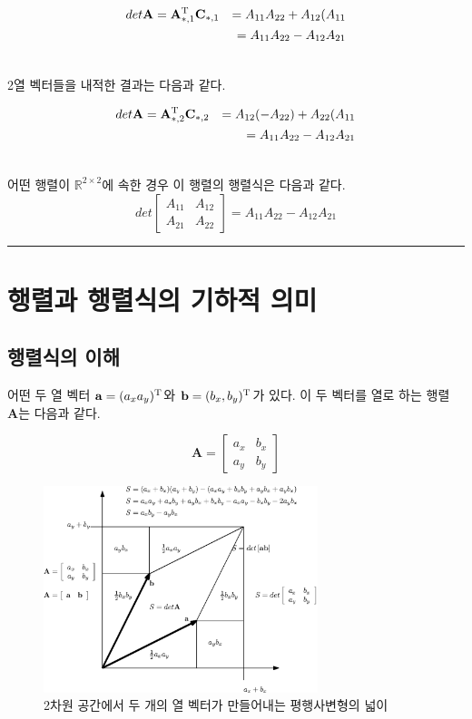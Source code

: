 \begin{eqnarray}
det \mathbf A & = \mathbf A_{*,1}^{\rm T} \mathbf C_{*,1} & =  A_{11}  A_{22} +  A_{12} (  A_{11} \\ \nonumber
& & =   A_{11}  A_{22} -  A_{12}  A_{21} \\ \nonumber
\end{eqnarray}

2열 벡터들을 내적한 결과는 다음과 같다.

\begin{eqnarray}
det \mathbf A & = \mathbf A_{*,2}^{\rm T} \mathbf C_{*,2} & =  A_{12} (-  A_{22}) +  A_{22} (  A_{11} \\ \nonumber
& & =   A_{11}  A_{22} -  A_{12}  A_{21} \\ \nonumber
\end{eqnarray}

어떤 행렬이 $\mathbb R^{2 \times 2}$에 속한 경우 이 행렬의 행렬식은 다음과 같다.
$$
det \left [
\begin{array}{cc}
A_{11} & A_{12} \\
A_{21} & A_{22}
\end{array}
\right ] =  A_{11}  A_{22} -  A_{12}  A_{21}
$$

\hrule
\vspace{2mm}


\section{행렬과 행렬식의 기하적 의미}

\subsection{행렬식의 이해}
어떤 두 열 벡터 $\mathbf a = (a_x a_y )^{\rm T}$와 $\mathbf b = (b_x , b_y)^{\rm T}$가 있다.
이 두 벡터를 열로 하는 행렬 $\mathbf A$는 다음과 같다.

$$\mathbf A = \left [ 
\begin{array}{cc}
a_x & b_x \\
a_y & b_y
\end{array}
\right ]
$$

\begin{figure}[h!]
  \centering
    \includegraphics[width=8cm]{Math_matrix/determinantGeo.eps}
    \caption{2차원 공간에서 두 개의 열 벡터가 만들어내는 평행사변형의 넓이}
    \label{fig:matrix:determinantGeo}
\end{figure}


